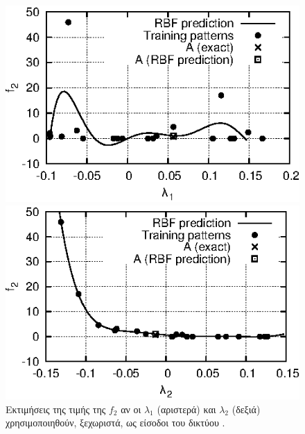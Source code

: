 \begin{figure}
\begin{minipage}{0.48\textwidth}
\includegraphics[scale=1.2]{IPE/f2_e1_b.eps}
\end{minipage}
\begin{minipage}{0.48\textwidth}
\includegraphics[scale=1.2]{IPE/f2_e2_b.eps}
\end{minipage}
\caption{Εκτιμήσεις της τιμής της $f_2$ αν οι $\lambda_1$ (αριστερά) και $\lambda_2$ (δεξιά) χρησιμοποιηθούν, ξεχωριστά, ως είσοδοι του δικτύου .}
\label{fig:f2e1e2}
\end{figure}


